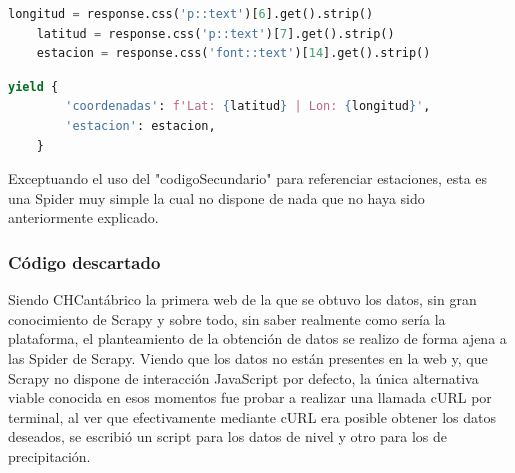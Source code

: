 \begin{lstlisting}[language=Python, caption={Selector en parse() de Chcantabrico Coordinates Spider}]
	longitud = response.css('p::text')[6].get().strip()
	latitud = response.css('p::text')[7].get().strip()
	estacion = response.css('font::text')[14].get().strip()
\end{lstlisting}

\begin{lstlisting}[language=Python, caption={Guardado de datos de Chcantabrico Coordinates Spider}]
	yield {
		'coordenadas': f'Lat: {latitud} | Lon: {longitud}',
		'estacion': estacion,
	}
\end{lstlisting}

Exceptuando el uso del "codigoSecundario" para referenciar estaciones, esta es una Spider muy simple la cual no dispone de nada que no haya sido anteriormente explicado.

\subsubsection{Código descartado}
Siendo CHCantábrico la primera web de la que se obtuvo los datos, sin gran conocimiento de Scrapy y sobre todo, sin saber realmente como sería la plataforma, el planteamiento de la obtención de datos se realizo de forma ajena a las Spider de Scrapy.\newline
\newline
Viendo que los datos no están presentes en la web y, que Scrapy no dispone de interacción JavaScript por defecto, la única alternativa viable conocida en esos momentos fue probar a realizar una llamada cURL por terminal, al ver que efectivamente mediante cURL era posible obtener los datos deseados, se escribió un script para los datos de nivel y otro para los de precipitación.

